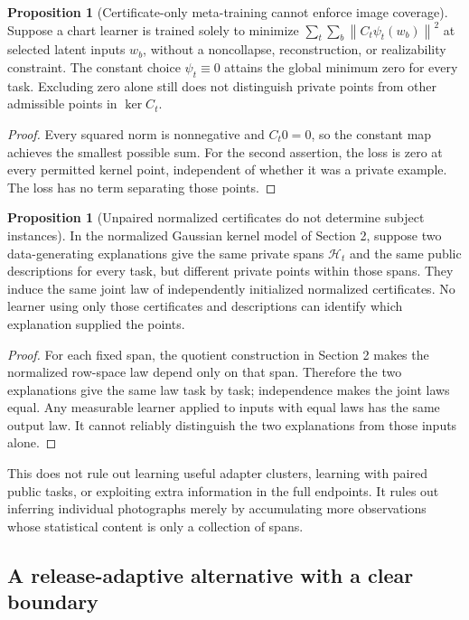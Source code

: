 \documentclass[11pt,a4paper]{article}
\theoremstyle{definition}
\newtheorem{proposition}[theorem]{Proposition}
\theoremstyle{definition}
\theoremstyle{remark}\newtheorem{remark}[theorem]{Remark}
\newcommand{\HH}{\mathcal H}\newcommand{\XX}{\mathcal X}\newcommand{\col}{\operatorname{col}}
\newcommand{\norm}[1]{\left\lVert #1\right\rVert}
\begin{document}
\begin{proposition}[Certificate-only meta-training cannot enforce image coverage]\label{prop:metacollapse}
Suppose a chart learner is trained solely to minimize
$\sum_t\sum_b\norm{C_t\psi_t(w_b)}^2$ at selected latent inputs $w_b$, without a noncollapse, reconstruction, or realizability constraint. The constant choice $\psi_t\equiv0$ attains the global minimum zero for every task. Excluding zero alone still does not distinguish private points from other admissible points in $\ker C_t$.
\end{proposition}
\begin{proof}
Every squared norm is nonnegative and $C_t0=0$, so the constant map achieves the smallest possible sum. For the second assertion, the loss is zero at every permitted kernel point, independent of whether it was a private example. The loss has no term separating those points.
\end{proof}

\begin{proposition}[Unpaired normalized certificates do not determine subject instances]\label{prop:metalimitation}
In the normalized Gaussian kernel model of Section 2, suppose two data-generating explanations give the same private spans $\HH_t$ and the same public descriptions for every task, but different private points within those spans. They induce the same joint law of independently initialized normalized certificates. No learner using only those certificates and descriptions can identify which explanation supplied the points.
\end{proposition}
\begin{proof}
For each fixed span, the quotient construction in Section 2 makes the normalized row-space law depend only on that span. Therefore the two explanations give the same law task by task; independence makes the joint laws equal. Any measurable learner applied to inputs with equal laws has the same output law. It cannot reliably distinguish the two explanations from those inputs alone.
\end{proof}

This does not rule out learning useful adapter clusters, learning with paired public tasks, or exploiting extra information in the full endpoints. It rules out inferring individual photographs merely by accumulating more observations whose statistical content is only a collection of spans.

\subsection{A release-adaptive alternative with a clear boundary}
\end{document}
